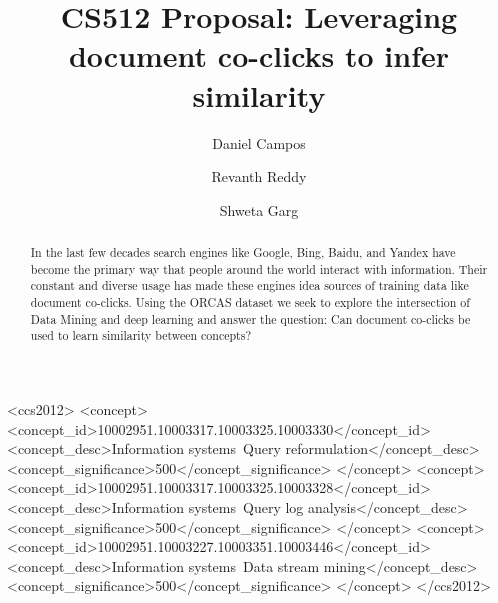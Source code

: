 \documentclass[sigplan,screen]{acmart}
\begin{document}
\title{CS512 Proposal: Leveraging document co-clicks to infer similarity}


\author{Daniel Campos} \author{Revanth Reddy}
\author{Shweta Garg} 


\begin{abstract}
In the last few decades search engines like Google, Bing, Baidu, and Yandex have become the primary way that people around the world interact with information. Their constant and diverse usage has made these engines idea sources of training data like document co-clicks. Using the ORCAS dataset we seek to explore the intersection of Data Mining and deep learning and answer the question: Can document co-clicks be used to learn similarity between concepts?
\end{abstract}

\begin{CCSXML}
<ccs2012>
<concept>
<concept_id>10002951.10003317.10003325.10003330</concept_id>
<concept_desc>Information systems~Query reformulation</concept_desc>
<concept_significance>500</concept_significance>
</concept>
<concept>
<concept_id>10002951.10003317.10003325.10003328</concept_id>
<concept_desc>Information systems~Query log analysis</concept_desc>
<concept_significance>500</concept_significance>
</concept>
<concept>
<concept_id>10002951.10003227.10003351.10003446</concept_id>
<concept_desc>Information systems~Data stream mining</concept_desc>
<concept_significance>500</concept_significance>
</concept>
</ccs2012>
\end{CCSXML}



\maketitle






\end{document}
